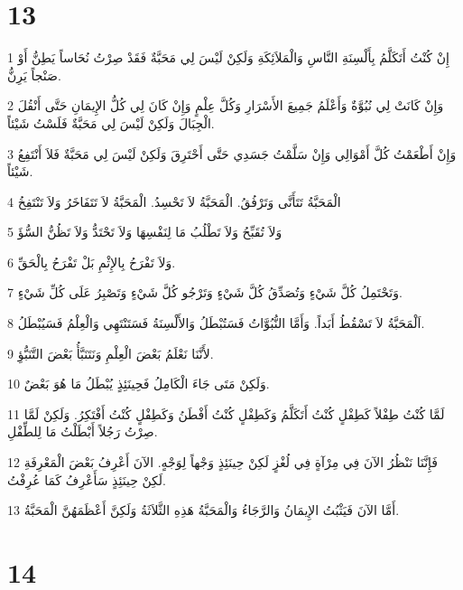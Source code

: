 \chapter{13}

\par 1 إِنْ كُنْتُ أَتَكَلَّمُ بِأَلْسِنَةِ النَّاسِ وَالْمَلاَئِكَةِ وَلَكِنْ لَيْسَ لِي مَحَبَّةٌ فَقَدْ صِرْتُ نُحَاساً يَطِنُّ أَوْ صَنْجاً يَرِنُّ.
\par 2 وَإِنْ كَانَتْ لِي نُبُوَّةٌ وَأَعْلَمُ جَمِيعَ الأَسْرَارِ وَكُلَّ عِلْمٍ وَإِنْ كَانَ لِي كُلُّ الإِيمَانِ حَتَّى أَنْقُلَ الْجِبَالَ وَلَكِنْ لَيْسَ لِي مَحَبَّةٌ فَلَسْتُ شَيْئاً.
\par 3 وَإِنْ أَطْعَمْتُ كُلَّ أَمْوَالِي وَإِنْ سَلَّمْتُ جَسَدِي حَتَّى أَحْتَرِقَ وَلَكِنْ لَيْسَ لِي مَحَبَّةٌ فَلاَ أَنْتَفِعُ شَيْئاً.
\par 4 الْمَحَبَّةُ تَتَأَنَّى وَتَرْفُقُ. الْمَحَبَّةُ لاَ تَحْسِدُ. الْمَحَبَّةُ لاَ تَتَفَاخَرُ وَلاَ تَنْتَفِخُ
\par 5 وَلاَ تُقَبِّحُ وَلاَ تَطْلُبُ مَا لِنَفْسِهَا وَلاَ تَحْتَدُّ وَلاَ تَظُنُّ السُّؤَ
\par 6 وَلاَ تَفْرَحُ بِالإِثْمِ بَلْ تَفْرَحُ بِالْحَقِّ.
\par 7 وَتَحْتَمِلُ كُلَّ شَيْءٍ وَتُصَدِّقُ كُلَّ شَيْءٍ وَتَرْجُو كُلَّ شَيْءٍ وَتَصْبِرُ عَلَى كُلِّ شَيْءٍ.
\par 8 اَلْمَحَبَّةُ لاَ تَسْقُطُ أَبَداً. وَأَمَّا النُّبُوَّاتُ فَسَتُبْطَلُ وَالأَلْسِنَةُ فَسَتَنْتَهِي وَالْعِلْمُ فَسَيُبْطَلُ.
\par 9 لأَنَّنَا نَعْلَمُ بَعْضَ الْعِلْمِ وَنَتَنَبَّأُ بَعْضَ التَّنَبُّؤِ.
\par 10 وَلَكِنْ مَتَى جَاءَ الْكَامِلُ فَحِينَئِذٍ يُبْطَلُ مَا هُوَ بَعْضٌ.
\par 11 لَمَّا كُنْتُ طِفْلاً كَطِفْلٍ كُنْتُ أَتَكَلَّمُ وَكَطِفْلٍ كُنْتُ أَفْطَنُ وَكَطِفْلٍ كُنْتُ أَفْتَكِرُ. وَلَكِنْ لَمَّا صِرْتُ رَجُلاً أَبْطَلْتُ مَا لِلطِّفْلِ.
\par 12 فَإِنَّنَا نَنْظُرُ الآنَ فِي مِرْآةٍ فِي لُغْزٍ لَكِنْ حِينَئِذٍ وَجْهاً لِوَجْهٍ. الآنَ أَعْرِفُ بَعْضَ الْمَعْرِفَةِ لَكِنْ حِينَئِذٍ سَأَعْرِفُ كَمَا عُرِفْتُ.
\par 13 أَمَّا الآنَ فَيَثْبُتُ الإِيمَانُ وَالرَّجَاءُ وَالْمَحَبَّةُ هَذِهِ الثَّلاَثَةُ وَلَكِنَّ أَعْظَمَهُنَّ الْمَحَبَّةُ.

\chapter{14}

